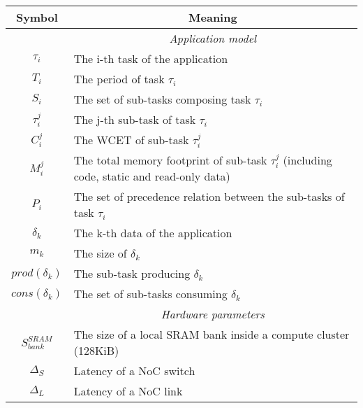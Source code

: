 \documentclass[main.tex]{subfiles}
\begin{document}
\begin{table}
\begin{center}
    \begin{tabular*}{\linewidth}{@{\extracolsep{\fill}} c l}
	\hline
        {\sc \textbf{Symbol}} 	& \multicolumn{1}{c}{{\sc \textbf{Meaning}}} 	\\

        \hline
         & \multicolumn{1}{c}{\emph{Application model}} \\
        \hline
        $\tau_i$            & The i-th task of the application \\
        $T_i$               & The period of task $\tau_i$ \\
        $S_i$               & The set of sub-tasks composing task $\tau_i$ \\
        $\tau_i^j$          & The j-th sub-task of task $\tau_i$ \\
        $C_i^j$             & The WCET of sub-task $\tau_i^j$ \\
        $M_i^j$             & The total memory footprint of sub-task $\tau_i^j$ (including code, static and read-only data)\\
        $P_i$               & The set of precedence relation between the sub-tasks of task $\tau_i$\\
        $\delta_k$          & The k-th data of the application \\
        $m_k$               & The size of $\delta_k$\\
        $prod(\delta_k)$    & The sub-task producing $\delta_k$ \\
        $cons(\delta_k)$    & The set of sub-tasks consuming $\delta_k$ \\

        
        \hline
         & \multicolumn{1}{c}{\emph{Hardware parameters}} \\
        \hline
        $S_{bank}^{SRAM}$   & The size of a local SRAM bank inside a compute cluster (128KiB) \\
        $\Delta_S$          & Latency of a NoC switch \\
        $\Delta_L$          & Latency of a NoC link \\
        

\end{tabular*}
\end{center}
\end{table}
\end{document}
